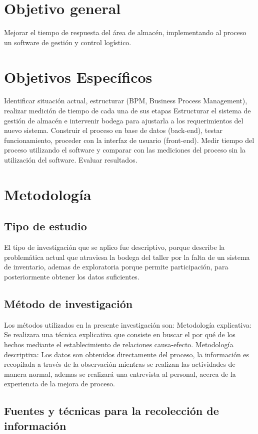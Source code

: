\documentclass[a4papper,11pt]{article}
\begin{document}
  \section{Objetivo general}
    Mejorar el tiempo de respuesta del área de almacén, implementando al proceso un software de gestión y control logístico.

  \section{Objetivos Específicos}
    Identificar situación actual, estructurar (BPM, Business Process Management), realizar medición de tiempo de cada una de sus etapas
    Estructurar el sistema de gestión de almacén e intervenir bodega para ajustarla a los requerimientos del nuevo sistema.
    Construir el proceso en base de datos (back-end), testar funcionamiento, proceder con la interfaz de usuario (front-end).
    Medir tiempo del proceso utilizando el software y comparar con las mediciones del proceso sin la utilización del software.
    Evaluar resultados.

  \section{Metodología}
    \subsection{Tipo de estudio}
      El tipo de investigación que se aplico fue descriptivo, porque describe la problemática actual que atraviesa la bodega del taller por la falta de un sistema de inventario, ademas de exploratoria porque permite participación, para posteriormente obtener los datos suficientes.
  \subsection{Método de investigación}
    Los métodos utilizados en la presente investigación son:
    Metodología explicativa: Se realizara una técnica explicativa que consiste en buscar el por qué de los hechos mediante el establecimiento de relaciones causa-efecto.
    Metodología descriptiva: Los datos son obtenidos directamente del proceso, la información es recopilada a través de la observación mientras se realizan las actividades de manera normal, ademas se realizará una entrevista al personal, acerca de la experiencia de la mejora de proceso.
  \subsection{Fuentes y técnicas para la recolección de información}
\end{document}
